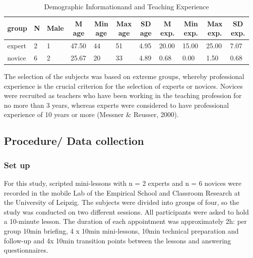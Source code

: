 \documentclass[
  english,
  man,floatsintext]{apa6}
\begin{document}
\begin{table}[h]

\begin{center}
\begin{threeparttable}

\caption{\label{tab:demographicspilottable}Demographic Informationand and Teaching Experience}

\small{

\begin{tabular}{lllllllllll}
\toprule
group & \multicolumn{1}{c}{N} & \multicolumn{1}{c}{Male} & \multicolumn{1}{c}{M age} & \multicolumn{1}{c}{Min age} & \multicolumn{1}{c}{Max age} & \multicolumn{1}{c}{SD age} & \multicolumn{1}{c}{M exp.} & \multicolumn{1}{c}{Min exp.} & \multicolumn{1}{c}{Max exp.} & \multicolumn{1}{c}{SD exp.}\\
\midrule
expert & 2 & 1 & 47.50 & 44 & 51 & 4.95 & 20.00 & 15.00 & 25.00 & 7.07\\
novice & 6 & 2 & 25.67 & 20 & 33 & 4.89 & 0.68 & 0.00 & 1.50 & 0.68\\
\bottomrule
\end{tabular}

}

\end{threeparttable}
\end{center}

\end{table}

The selection of the subjects was based on extreme groups, whereby professional experience is the crucial criterion for the selection of experts or novices. Novices were recruited as teachers who have been working in the teaching profession for no more than 3 years, whereas experts were considered to have professional experience of 10 years or more (Messner \& Reusser, 2000).

\hypertarget{procedure-data-collection}{%
\subsection{Procedure/ Data collection}\label{procedure-data-collection}}

\hypertarget{set-up}{%
\subsubsection{Set up}\label{set-up}}

For this study, scripted mini-lessons with n = 2 experts and n = 6 novices were recorded in the mobile Lab of the Empirical School and Classroom Research at the University of Leipzig. The subjects were divided into groups of four, so the study was conducted on two different sessions. All participants were asked to hold a 10-minute lesson. The duration of each appointment was approximately 2h: per group 10min briefing, 4 x 10min mini-lessons, 10min technical preparation and follow-up and 4x 10min transition points between the lessons and answering questionnaires.
\end{document}
